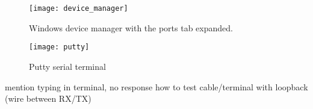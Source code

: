 \documentclass[11pt,fleqn]{book} %
\begin{document}
\begin{figure}[]
    \centering\texttt{[image: device\_manager]}
    \caption{Windows device manager with the ports tab expanded.}
    \label{device_manager}
\end{figure}
\begin{figure}[]
    \centering\texttt{[image: putty]}
    \caption{Putty serial terminal}
    \label{putty}
\end{figure}
mention typing in terminal, no response
how to test cable/terminal with loopback (wire between RX/TX)

\end{document}
